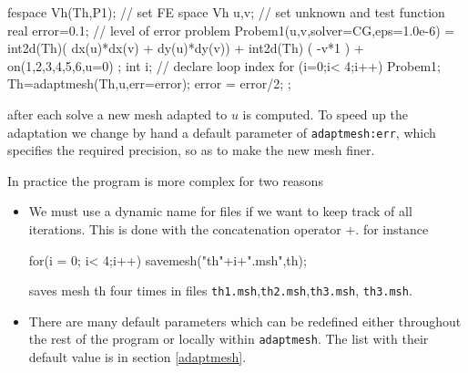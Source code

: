 \documentclass[twoside]{book}
\begin{document}
\bFF

fespace Vh(Th,P1);  // set FE space
Vh u,v;             // set unknown and test function
real error=0.1;        // level of error
problem Probem1(u,v,solver=CG,eps=1.0e-6) =
    int2d(Th)(  dx(u)*dx(v) + dy(u)*dy(v))
  + int2d(Th) ( -v*1 )
  + on(1,2,3,4,5,6,u=0)  ;
int i;               //   declare loop index
for (i=0;i< 4;i++)
{
  Probem1;
  Th=adaptmesh(Th,u,err=error);
  error = error/2;
} ;
\eFF

after each solve a new mesh adapted to $u$ is computed.  To speed up the adaptation
we change by hand a default parameter of \texttt{adaptmesh:err}, which
specifies the required precision, so as to make the new mesh finer.

\medskip

In practice the program is more complex for two reasons

\begin{itemize}
\item We must use a dynamic name for files
if we want to keep track of all iterations.
This is done with the concatenation operator $+$. for instance
\bFF

for(i = 0; i< 4;i++)
    savemesh("th"+i+".msh",th);
\eFF

saves mesh th four times in files \texttt{th1.msh},\texttt{th2.msh},\texttt{th3.msh},
\texttt{th3.msh}.
\item There are many default parameters  which can be redefined either throughout the rest
of the program or locally within \texttt{adaptmesh}.
The list   with their default value is in section \ref{adaptmesh}.
\end{itemize}
\end{document}
